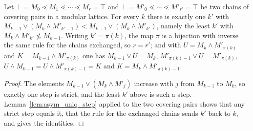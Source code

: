 \begin{proposition}
    \label{prop:asym_uniq_matching}
    \leanok
    Let $\bot=M_0\lessdot M_1\lessdot\cdots\lessdot M_r=\top$ and
    $\bot=M'_0\lessdot\cdots\lessdot M'_{r'}=\top$ be two chains of covering
    pairs in a modular lattice. For every $k$ there is exactly one $k'$ with
    $M_{k-1}\vee(M_k\wedge M'_{k'-1})<M_{k-1}\vee(M_k\wedge M'_{k'})$, namely
    the least $k'$ with $M_k\wedge M'_{k'}\not\leq M_{k-1}$. Writing
    $k'=\pi(k)$, the map $\pi$ is a bijection with inverse the same rule for
    the chains exchanged, so $r=r'$; and with $U=M_k\wedge M'_{\pi(k)}$ and
    $K=M_{k-1}\wedge M'_{\pi(k)}$ one has $M_{k-1}\vee U=M_k$,
    $M'_{\pi(k)-1}\vee U=M'_{\pi(k)}$, $U\wedge M_{k-1}=U\wedge
        M'_{\pi(k)-1}=K$ and $K=M_k\wedge M'_{\pi(k)-1}$.
\end{proposition}

\begin{proof}
    \leanok
    The elements $M_{k-1}\vee(M_k\wedge M'_j)$ increase with $j$ from
    $M_{k-1}$ to $M_k$, so exactly one step is strict, and the least $k'$
    above is such a step. Lemma~\ref{lem:asym_uniq_step} applied to the two
    covering pairs shows that any strict step equals it, that the rule for
    the exchanged chains sends $k'$ back to $k$, and gives the identities.
\end{proof}
